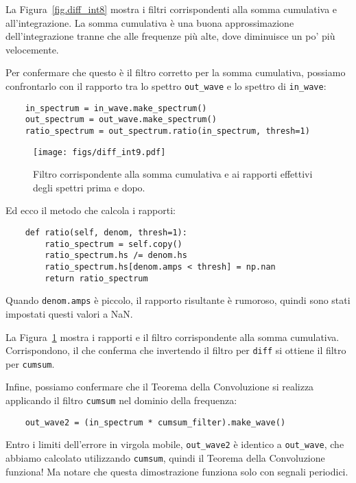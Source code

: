 \documentclass[12pt,a4paper]{book}
\begin{document}
La Figura~\ref{fig.diff_int8} mostra i filtri corrispondenti alla somma cumulativa e all'integrazione. La somma cumulativa è una buona approssimazione dell'integrazione tranne che alle frequenze più alte, dove diminuisce un po' più velocemente.

Per confermare che questo è il filtro corretto per la somma cumulativa, possiamo confrontarlo con il rapporto tra lo spettro \verb"out_wave" e lo spettro di \verb"in_wave":

\begin{verbatim} 
    in_spectrum = in_wave.make_spectrum()
    out_spectrum = out_wave.make_spectrum()
    ratio_spectrum = out_spectrum.ratio(in_spectrum, thresh=1)
 \end{verbatim} 

\begin{figure} 

\centerline{\texttt{[image: figs/diff\_int9.pdf]}} \caption{Filtro corrispondente alla somma cumulativa e ai rapporti effettivi degli spettri prima e dopo.} \label{fig.diff_int9} \end{figure} 

Ed ecco il metodo che calcola i rapporti:

\begin{verbatim} 
    def ratio(self, denom, thresh=1):
        ratio_spectrum = self.copy()
        ratio_spectrum.hs /= denom.hs
        ratio_spectrum.hs[denom.amps < thresh] = np.nan
        return ratio_spectrum
 \end{verbatim} 

Quando {\tt denom.amps} è piccolo, il rapporto risultante è rumoroso, quindi sono stati impostati questi valori a NaN.

La Figura~\ref{fig.diff_int9} mostra i rapporti e il filtro corrispondente alla somma cumulativa. Corrispondono, il che conferma che invertendo il filtro per {\tt diff} si ottiene il filtro per {\tt cumsum}.

Infine, possiamo confermare che il Teorema della Convoluzione si realizza applicando il filtro {\tt cumsum} nel dominio della frequenza:

\begin{verbatim} 
    out_wave2 = (in_spectrum * cumsum_filter).make_wave()
 \end{verbatim} 

Entro i limiti dell'errore in virgola mobile, \verb"out_wave2" è identico a \verb"out_wave", che abbiamo calcolato utilizzando {\tt cumsum}, quindi il Teorema della Convoluzione funziona! Ma notare che questa dimostrazione funziona solo con segnali periodici.
\end{document}
